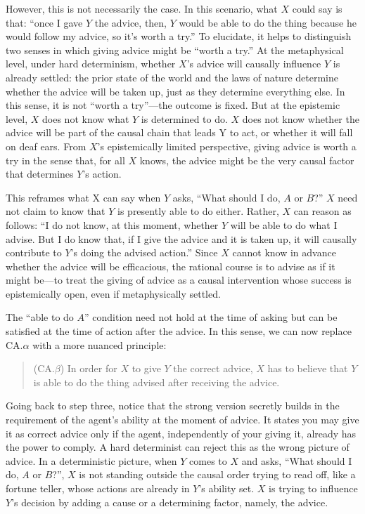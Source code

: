 However, this is not necessarily the case. In this scenario, what $X$
could say is that: ``once I gave $Y$ the advice, then, $Y$ would be able to
do the thing because he would follow my advice, so it's worth a try.''
To elucidate, it helps to distinguish two senses in which giving advice
might be ``worth a try.'' At the metaphysical level, under hard
determinism, whether $X$'s advice will causally influence $Y$ is already
settled: the prior state of the world and the laws of nature determine
whether the advice will be taken up, just as they determine everything
else. In this sense, it is not ``worth a try''---the outcome is
fixed. But at the epistemic level, $X$ does not know what $Y$ is determined
to do. $X$ does not know whether the advice will be part of the causal
chain that leads Y to act, or whether it will fall on deaf ears. From
$X$'s epistemically limited perspective, giving advice is worth a try in
the sense that, for all $X$ knows, the advice might be the very causal
factor that determines $Y$'s action.

This reframes what X can say when $Y$ asks, ``What should I do, $A$ or $B$?''
$X$ need not claim to know that $Y$ is presently able to do either. Rather,
$X$ can reason as follows: ``I do not know, at this moment, whether $Y$ will
be able to do what I advise. But I do know that, if I give the advice
and it is taken up, it will causally contribute to $Y$'s doing the advised
action.'' Since $X$ cannot know in advance whether the advice will be
efficacious, the rational course is to advise as if it might be---to
treat the giving of advice as a causal intervention whose success is
epistemically open, even if metaphysically settled.

The ``able to do $A$'' condition need not hold at the time of asking but
can be satisfied at the time of action after the advice. In this sense,
we can now replace CA.$\alpha$ with a more nuanced principle:

\vspace{-1em}
\begin{quote}
(CA.$\beta$) In order for $X$ to give $Y$ the correct advice, $X$ has to believe
that $Y$ is able to do the thing advised after receiving the advice.
\end{quote}

\noindent Going back to step three, notice that the strong version secretly builds
in the requirement of the agent's ability at the moment of advice. It
states you may give it as correct advice only if the agent,
independently of your giving it, already has the power to comply. A hard
determinist can reject this as the wrong picture of advice. In a
deterministic picture, when $Y$ comes to $X$ and asks, ``What should I do, $A$
or $B$?'', $X$ is not standing outside the causal order trying to read off,
like a fortune teller, whose actions are already in $Y$'s ability set. $X$
is trying to influence $Y$'s decision by adding a cause or a determining
factor, namely, the advice.

